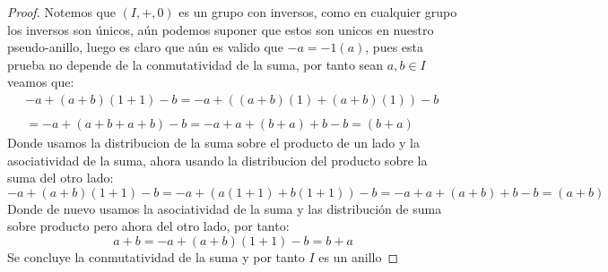 \documentclass[11pt,letterpaper]{article}
\begin{document}
\begin{proof}
    Notemos que $(I,+,0)$ es un grupo con inversos, como en cualquier grupo los inversos son \'unicos, a\'un podemos suponer que estos son unicos en nuestro
    pseudo-anillo, luego es claro que a\'un es valido que $-a=-1(a)$, pues esta prueba no depende de la conmutatividad de la suma, por tanto sean $a,b\in I$ veamos que:\,\\
    \begin{align*}
        -a+(a+b)(1+1)-b=-a+((a+b)(1)+(a+b)(1))-b\,\\
        \,\\
        =-a+(a+b+a+b)-b=-a+a+(b+a)+b-b=(b+a)
    \end{align*}
    Donde usamos la distribucion de la suma sobre el producto de un lado y la asociatividad de la suma, ahora usando la distribucion del producto sobre la suma del otro lado:\,\\
    \begin{equation*}
        -a+(a+b)(1+1)-b=-a+(a(1+1)+b(1+1))-b=-a+a+(a+b)+b-b=(a+b)
    \end{equation*}
    Donde de nuevo usamos la asociatividad de la suma y las distribuci\'on de suma sobre producto pero ahora del otro lado, por tanto:\,\\
    \begin{equation*}
        a+b=-a+(a+b)(1+1)-b=b+a
    \end{equation*}
    Se concluye la conmutatividad de la suma y por tanto $I$ es un anillo
\end{proof}
\end{document}
